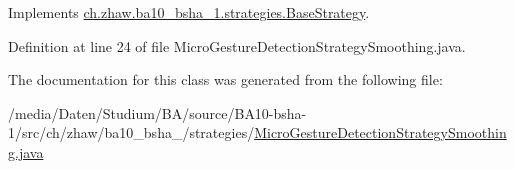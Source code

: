 Implements \hyperlink{classch_1_1zhaw_1_1ba10__bsha__1_1_1strategies_1_1BaseStrategy_af6ea27835befac71906915236a347450}{ch.zhaw.ba10\_\-bsha\_\-1.strategies.BaseStrategy}.

Definition at line 24 of file MicroGestureDetectionStrategySmoothing.java.

The documentation for this class was generated from the following file:\begin{DoxyCompactItemize}
\item 
/media/Daten/Studium/BA/source/BA10-\/bsha-\/1/src/ch/zhaw/ba10\_\-bsha\_/strategies/\hyperlink{MicroGestureDetectionStrategySmoothing_8java}{MicroGestureDetectionStrategySmoothing.java}\end{DoxyCompactItemize}
